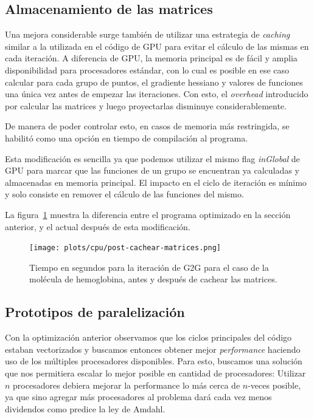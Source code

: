 \subsection{Almacenamiento de las matrices}

Una mejora considerable surge tambi\'en de utilizar una estrategia de \textit{caching}
similar a la utilizada en el c\'odigo de GPU para evitar el c\'alculo de las mismas
en cada iteraci\'on. A diferencia de GPU, la memoria principal es de f\'acil y
amplia disponibilidad para procesadores est\'andar, con lo cual es posible en ese
caso calcular para cada grupo de puntos, el gradiente hessiano y valores de
funciones una \'unica vez antes de empezar las iteraciones. Con esto, el
\textit{overhead} introducido por calcular las matrices y luego proyectarlas
disminuye considerablemente.

De manera de poder controlar esto, en casos de memoria m\'as restringida, se
habilit\'o como una opci\'on en tiempo de compilaci\'on al programa.

Esta modificaci\'on es sencilla ya que podemos utilizar el mismo flag
\textit{inGlobal} de GPU para marcar que las funciones de un grupo se encuentran
ya calculadas y almacenadas en memoria principal. El impacto en el ciclo de
iteraci\'on es m\'inimo y solo consiste en remover el c\'alculo de las funciones
del mismo.

La figura~\ref{fig:lio-post-cachear} muestra la diferencia entre el programa
optimizado en la secci\'on anterior, y el actual despu\'es de esta modificaci\'on.

\begin{figure}[htbp]
   \centering
   \texttt{[image: plots/cpu/post-cachear-matrices.png]}
   \caption{Tiempo en segundos para la iteraci\'on de G2G para el caso de la
   mol\'ecula de hemoglobina, antes y despu\'es de cachear las matrices.}
   \label{fig:lio-post-cachear}
\end{figure}

\subsection{Prototipos de paralelizaci\'on}

Con la optimizaci\'on anterior observamos que los ciclos principales del c\'odigo
estaban vectorizados y buscamos entonces obtener mejor \textit{performance} haciendo
uso de los m\'ultiples procesadores disponibles. Para esto, buscamos una soluci\'on
que nos permitiera escalar lo mejor posible en cantidad de procesadores: Utilizar
$n$ procesadores debiera mejorar la performance lo m\'as cerca de $n$-veces posible,
ya que sino agregar m\'as procesadores al problema dar\'a cada vez menos dividendos
como predice la ley de Amdahl.

